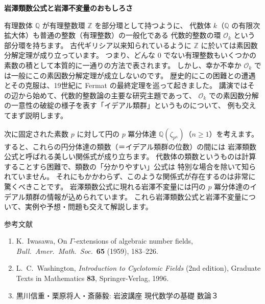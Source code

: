 \documentclass[uplatex,dvipdfmx]{jlreq}
\begin{document}
\newpage

\begin{center}
  {\Large\bfseries 岩澤類数公式と岩澤不変量のおもしろさ}
\end{center}

\bigskip
\hspace*{\fill}{\large\bfseries 尾崎　学（島根大・総合理工）}

\bigskip

有理数体 $\mathbb{Q}$ が有理整数環 $\mathbb{Z}$ を部分環として持つように、
代数体 $k$（$\mathbb{Q}$ の有限次拡大体）も普通の整数（有理整数）の一般化である
代数的整数の環 $\mathcal{O}_k$ という部分環を持ちます。
古代ギリシア以来知られているように $\mathbb{Z}$ に於いては素因数分解定理が成り立っています。
つまり、どんな $0$ でない有理整数もいくつかの素数の積として本質的に一通りの方法で表されます。
しかし、幸か不幸か $\mathcal{O}_k$ では一般にこの素因数分解定理が成立しないのです。
歴史的にこの困難との遭遇とその克服は、19世紀に Fermat の最終定理を巡って起きました。
講演ではその辺から始めて、代数的整数論の主要な研究主題であって、
$\mathcal{O}_k$ での素因数分解の一意性の破綻の様子を表す「イデアル類群」というものについて、
例も交えてまず説明します。

次に固定された素数 $p$ に対して円の $p$ 冪分体達
$\mathbb{Q}(\zeta_{p^n})$（$n \geq 1$）を考えます。
すると、これらの円分体達の類数（＝イデアル類群の位数）の間には
岩澤類数公式と呼ばれる美しい関係式が成り立ちます。
代数体の類数というものは計算することすら困難で、類数の「分かりやすい」公式は
特別な場合を除いて知られていません。
それにもかかわらず、このような関係式が存在するのは非常に驚くべきことです。
岩澤類数公式に現れる岩澤不変量には円の $p$ 冪分体達のイデアル類群の情報が込められています。
これら岩澤類数公式と岩澤不変量について、実例や予想・問題も交えて解説します。

\vspace{1pc}

\begin{center}
  \textsc{参考文献}
\end{center}
\begin{enumerate}
  \item K.~Iwasawa,
        On $\Gamma$-extensions of algebraic number fields,
        \textit{Bull.~Amer.~Math.~Soc.}~\textbf{65} (1959), 183--226.
  \item L.~C.~Washington,
        \textit{Introduction to Cyclotomic Fields} (2nd edition),
        Graduate Texts in Mathematics \textbf{83},
        Springer-Verlag, 1996.
  \item 黒川信重・栗原将人・斎藤毅:
        岩波講座 現代数学の基礎 数論３
\end{enumerate}
\end{document}
